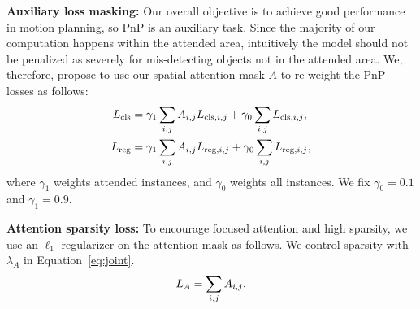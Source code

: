 \textbf{Auxiliary loss masking:} Our overall objective is to achieve good performance
in motion planning, so PnP is an auxiliary task. Since the majority of our
computation happens within the attended area, intuitively the model should not be penalized as
severely for mis-detecting objects not in the attended area. We, therefore, propose to use
our spatial attention mask $A$ to re-weight the PnP losses as follows:
\begin{align}
L_{\text{cls}} &= \gamma_1 \sum_{i,j} A_{i,j} L_{\text{cls},i,j} + \gamma_0 \sum_{i,j} L_{\text{cls},i,j},\\
L_{\text{reg}} &= \gamma_1 \sum_{i,j} A_{i,j} L_{\text{reg},i,j} + \gamma_0 \sum_{i,j} L_{\text{reg},i,j},
\label{eq:reweight}
\end{align}
where $\gamma_1$ weights attended instances, and $\gamma_0$ weights all instances. We fix $\gamma_0 = 0.1$ and $\gamma_1 = 0.9$.

\textbf{Attention sparsity loss:}
To encourage focused attention and high sparsity, we use an $\ell_1$ regularizer on the attention mask as follows. We control sparsity with $\lambda_A$ in Equation~\ref{eq:joint}.
\vskip -0.05in
\begin{align}
L_{A} = \sum_{i,j} A_{i,j}.
\label{eq:regularize}
\end{align}
\vskip -0.05in